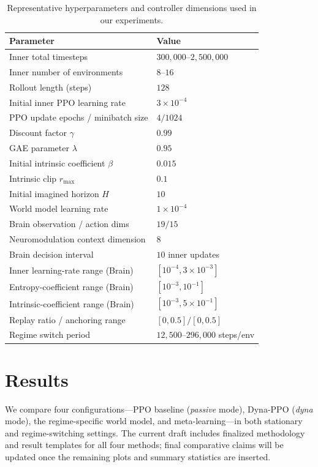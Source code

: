 ﻿\documentclass[sigconf]{acmart}
\begin{document}
\begin{table}[t]
  \caption{Representative hyperparameters and controller dimensions used in our experiments.}
  \label{tab:hyperparams}
  \centering
  \begin{tabular}{@{}ll@{}}
    \toprule
    Parameter & Value \\
    \midrule
    Inner total timesteps & $300{,}000$--$2{,}500{,}000$ \\
    Inner number of environments & $8$--$16$ \\
    Rollout length (steps) & $128$ \\
    Initial inner PPO learning rate & $3 \times 10^{-4}$ \\
    PPO update epochs / minibatch size & $4 / 1024$ \\
    Discount factor $\gamma$ & $0.99$ \\
    GAE parameter $\lambda$ & $0.95$ \\
    Initial intrinsic coefficient $\beta$ & $0.015$ \\
    Intrinsic clip $r_{\max}$ & $0.1$ \\
    Initial imagined horizon $H$ & $10$ \\
    World model learning rate & $1 \times 10^{-4}$ \\
    Brain observation / action dims & $19 / 15$ \\
    Neuromodulation context dimension & $8$ \\
    Brain decision interval & $10$ inner updates \\
    Inner learning-rate range (Brain) & $[10^{-4}, 3 \times 10^{-3}]$ \\
    Entropy-coefficient range (Brain) & $[10^{-3}, 10^{-1}]$ \\
    Intrinsic-coefficient range (Brain) & $[10^{-3}, 5 \times 10^{-1}]$ \\
    Replay ratio / anchoring range & $[0, 0.5] / [0, 0.5]$ \\
    Regime switch period & $12{,}500$--$296{,}000$ steps/env \\
    \bottomrule
  \end{tabular}
\end{table}

\section{Results}
\label{sec:results}

We compare four configurations---PPO baseline (\emph{passive} mode), Dyna-PPO (\emph{dyna} mode), the regime-specific world model, and meta-learning---in both stationary and regime-switching settings. The current draft includes finalized methodology and result templates for all four methods; final comparative claims will be updated once the remaining plots and summary statistics are inserted.
\end{document}
